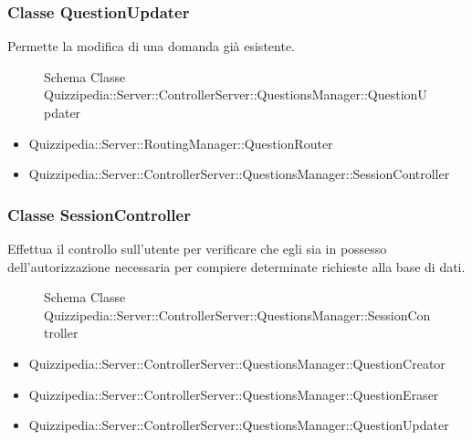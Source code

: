 \subsubsection{Classe QuestionUpdater}
Permette la modifica di una domanda già esistente.
\begin{figure}[H]
\centering
\noindent{}
\caption{Schema Classe Quizzipedia::Server::ControllerServer::QuestionsManager::QuestionUpdater}
\end{figure}
\begin{itemize}
\item Quizzipedia::Server::RoutingManager::QuestionRouter
\end{itemize}
\begin{itemize}
\item Quizzipedia::Server::ControllerServer::QuestionsManager::SessionController
\end{itemize}
\subsubsection{Classe SessionController}
Effettua il controllo sull'utente per verificare che egli sia in possesso dell'autorizzazione necessaria per compiere determinate richieste alla base di dati.
\begin{figure}[H]
\centering
\noindent{}
\caption{Schema Classe Quizzipedia::Server::ControllerServer::QuestionsManager::SessionController}
\end{figure}
\begin{itemize}
\item Quizzipedia::Server::ControllerServer::QuestionsManager::QuestionCreator
\item Quizzipedia::Server::ControllerServer::QuestionsManager::QuestionEraser
\item Quizzipedia::Server::ControllerServer::QuestionsManager::QuestionUpdater
\end{itemize}
